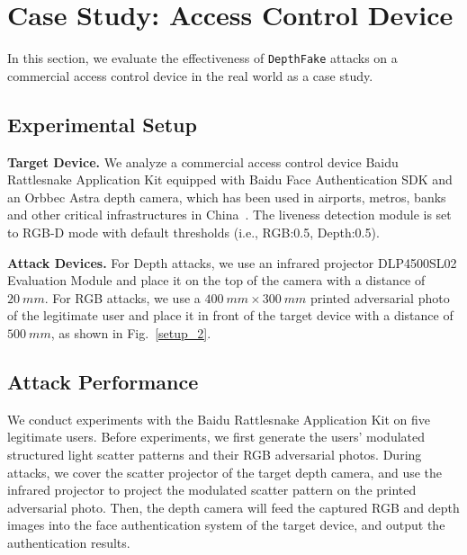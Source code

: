 \section{Case Study: Access Control Device}
In this section, we evaluate the effectiveness of \texttt{DepthFake} attacks on a commercial access control device in the real world as a case study.



\subsection{Experimental Setup}
\textbf{Target Device.} We analyze a commercial access control device Baidu Rattlesnake Application Kit equipped with Baidu Face Authentication SDK and an Orbbec Astra depth camera, which has been used in airports, metros, banks and other critical infrastructures in China~\cite{baidu_customer}.
The liveness detection module is set to RGB-D mode with default thresholds  (i.e., RGB:0.5, Depth:0.5).

\textbf{Attack Devices.} For Depth attacks, we use an infrared projector DLP4500SL02 Evaluation Module and place it on the top of the camera with a distance of $20~mm$. For RGB attacks, we use a $400~mm\times300~mm$ printed adversarial photo of the legitimate user and place it in front of the target device with a distance of $500~mm$, as shown in Fig.~\ref{setup_2}.



\subsection{Attack Performance}
We conduct experiments with the Baidu Rattlesnake Application Kit on five legitimate users.
Before experiments, we first generate the users' modulated structured light scatter patterns and their RGB adversarial photos.
During attacks, we cover the scatter projector of the target depth camera, and use the infrared projector to project the modulated scatter pattern on the printed adversarial photo. Then, the depth camera will feed the captured RGB and depth images into the face authentication system of the target device, and  output the authentication results.

